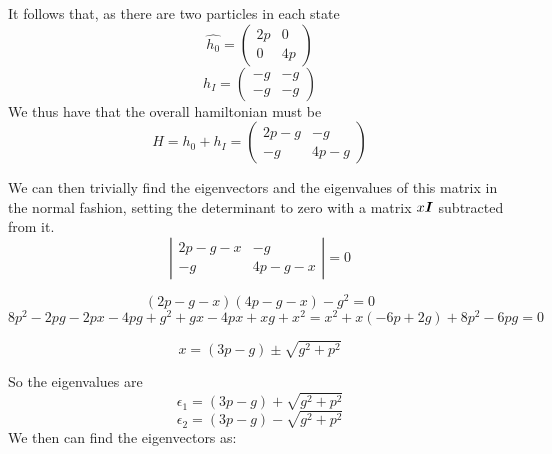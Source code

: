 \documentclass[11pt]{article} %
\begin{document}
It follows that, as there are two particles in each state \\
\begin{equation}
\hat{h_0}=\left(\begin{matrix} 2p & 0\\ 0 & 4p \end{matrix} \right)
\end{equation}
\begin{equation}
h_I=\left( \begin{matrix}-g & -g \\-g & -g \end{matrix}\right)
\end{equation}
We thus have that the overall hamiltonian must be\\

\begin{equation}
H=h_0+h_I=\left(\begin{matrix} 2p-g & -g \\ -g & 4p-g\end{matrix}\right)
\end{equation}

We can then trivially find the eigenvectors and the eigenvalues of this matrix in the normal fashion, setting the determinant to zero with a matrix $x\matrixsym{I}$ subtracted from it.\\

\begin{equation}
\left|\begin{matrix} 2p-g-x & -g \\ -g & 4p-g-x\end{matrix}\right|=0
\end{equation}

\begin{equation}
(2p-g-x)(4p-g-x)-g^2=0
\end{equation}
\begin{equation}
8p^2-2pg-2px-4pg+g^2+gx-4px+xg+x^2=x^2+x(-6p+2g)+8p^2-6pg=0
\end{equation}

\begin{equation}
x=(3p-g)\pm \sqrt{g^2+p^2}
\end{equation}

So the eigenvalues are\\

\begin{equation}
\epsilon_1=(3p-g)+\sqrt{g^2+p^2}
\end{equation}
\begin{equation}
\epsilon_2=(3p-g)-\sqrt{g^2+p^2}
\end{equation}
We then can find the eigenvectors as:\\
\end{document}
